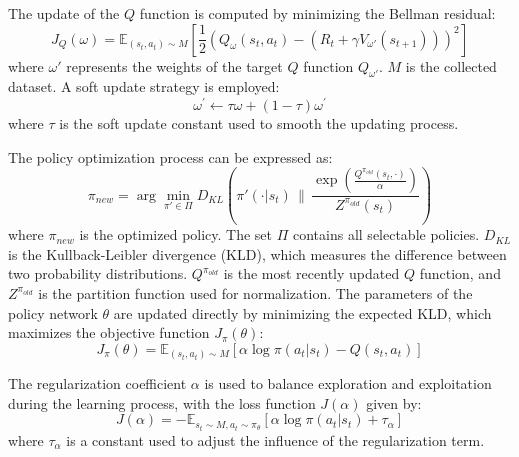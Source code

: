 \documentclass[preprint,12pt]{elsarticle}
\begin{document}
The update of the $Q$ function is computed by minimizing the Bellman residual:
\begin{equation}
J_Q(\omega) = \mathbb{E}_{(s_t, a_t) \sim M} \left[ \frac{1}{2} \left( Q_{\omega}(s_t, a_t) - (R_t + \gamma V_{\omega'} (s_{t+1})) \right)^2 \right]
\end{equation}
where $\omega'$ represents the weights of the target $Q$ function $Q_{\omega'}$. $M$ is the collected dataset. A soft update strategy is employed:
\begin{equation}
    \omega^{'} \leftarrow \tau \omega + (1 - \tau) \omega^{'}\label{soft_update}
\end{equation}
where $\tau$ is the soft update constant used to smooth the updating process.

The policy optimization process can be expressed as:
\begin{equation}
    \pi_{new} = \arg \min_{\pi' \in \Pi} D_{KL} \left( \pi'(\cdot | s_t) \, \| \, \frac{\exp\left(\frac{Q^{\pi_{old}}(s_t, \cdot)}{\alpha}\right)}{Z^{\pi_{old}}(s_t)} \right)
\end{equation}
where $\pi_{new}$ is the optimized policy. The set $\Pi$ contains all selectable policies. $D_{KL}$ is the Kullback-Leibler divergence (KLD), which measures the difference between two probability distributions. $Q^{\pi_{old}}$ is the most recently updated $Q$ function, and $Z^{\pi_{old}}$ is the partition function used for normalization. The parameters of the policy network $\theta$ are updated directly by minimizing the expected KLD, which maximizes the objective function $J_{\pi}(\theta)$:
\begin{equation}
    J_{\pi}(\theta) = \mathbb{E}_{(s_t, a_t) \sim M} \left[ \alpha \log \pi(a_t | s_t) - Q(s_t, a_t) \right]
\end{equation}

The regularization coefficient $\alpha$ is used to balance exploration and exploitation during the learning process, with the loss function $J(\alpha)$ given by:
\begin{equation}
J(\alpha) = -\mathbb{E}_{s_t \sim M,a_t \sim \pi_{\theta}} \left[ \alpha \log \pi(a_t | s_t) + \tau_{\alpha} \right]
\end{equation}
where $\tau_{\alpha}$ is a constant used to adjust the influence of the regularization term.
\end{document}
